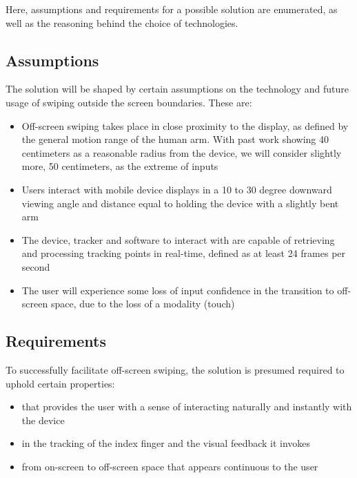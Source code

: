 
\noi Here,  assumptions and requirements for a possible solution are enumerated, as well as the reasoning behind the choice of technologies.\\


\subsection{Assumptions}

The solution will be shaped by certain assumptions on the technology and future usage of swiping outside  the screen boundaries. These are:	 

\begin{itemize}
	\item Off-screen swiping takes place in close proximity to the display, as defined by the general motion range of the human arm. With past work showing 40 centimeters as a reasonable radius from the device\cite{adbin}, we will consider slightly more, 50 centimeters, as the extreme of inputs
	\item Users interact with mobile device displays in a 10 to 30 degree downward viewing angle and distance equal to holding the device with a slightly bent arm 
	\item The device, tracker and software to interact with are capable of retrieving and processing tracking points in real-time, defined as at least 24 frames per second
	\item The user will experience some loss of input confidence in the transition to off-screen space, due to the loss of a modality (touch)
\end{itemize}
	
\subsection{Requirements}

To successfully facilitate off-screen swiping, the solution is presumed required to uphold certain properties:

\begin{itemize}
	\item {} that provides the user with a sense of interacting naturally and instantly with the device 
	\item {} in the tracking of the index finger and the visual feedback it invokes
	\item {} from on-screen  to off-screen space that appears continuous to the user
\end{itemize}



